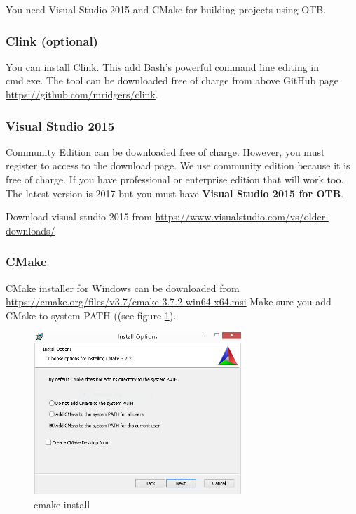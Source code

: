 \documentclass[10pt,a4paper]{article}
\begin{document}
You need Visual Studio 2015 and CMake for building projects using OTB.

\subsubsection{Clink (optional)}
You can install Clink. This add Bash's powerful command line editing in
cmd.exe. The tool can be downloaded free of charge from above GitHub
page \url{https://github.com/mridgers/clink}.

\subsubsection{Visual Studio 2015}
Community Edition can be downloaded free of charge. However, you must register
to access to the download page. We use community edition because it is free
of charge. If you have professional or enterprise edition that will work
too. The latest version is 2017 but you must have \textbf{Visual Studio 2015 for OTB}. 

Download visual studio 2015 from \url{https://www.visualstudio.com/vs/older-downloads/}

\subsubsection{CMake}
CMake installer for Windows can be downloaded from \url{https://cmake.org/files/v3.7/cmake-3.7.2-win64-x64.msi}
\newline
Make sure you add CMake to system PATH ((see figure \ref{fig:cmake-install}).

\begin{figure}[!htbp]
  \center
  \includegraphics[width=0.7\textwidth]{Art/cmake-install.png}
  \caption[]{cmake-install}
  \label{fig:cmake-install}
\end{figure}
\end{document}
